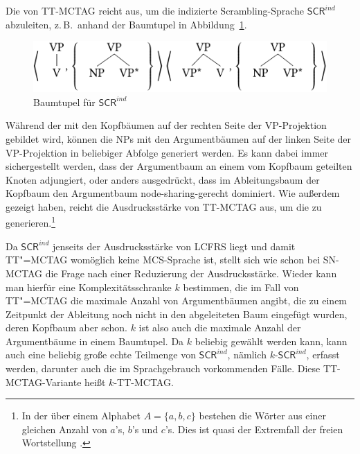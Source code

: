 Die  von TT-MCTAG reicht aus, um die indizierte Scrambling-Sprache $\mathsf{SCR}^{ind}$ abzuleiten, z.\,B.\ anhand der Baumtupel in Abbildung~\ref{fig-ttmctag-scr}.  
\begin{figure}[t]
\centering
\includegraphics{graphics/abb73.pdf}
\caption{Baumtupel für $\mathsf{SCR}^{ind}$\label{fig-ttmctag-scr}}
\end{figure}
Während der  mit den Kopfbäumen auf der rechten Seite der VP-Projektion gebildet wird, können die NPs mit den Argumentbäumen auf der linken Seite der VP-Projektion in beliebiger Abfolge generiert werden. Es kann dabei immer sichergestellt werden, dass der Argumentbaum an einem vom Kopfbaum geteilten Knoten adjungiert, oder anders ausgedrückt, dass im Ableitungsbaum der Kopfbaum den Argumentbaum node-sharing-gerecht dominiert. Wie  \citet{Sogaard:Lichte:Maier:07} au\ss erdem gezeigt haben, reicht die Ausdrucksstärke von TT-MCTAG  aus, um die  zu generieren.\footnote{In der  über einem Alphabet $A=\{a,b,c\}$ bestehen die Wörter aus einer gleichen Anzahl von $a$'s, $b$'s und $c$'s. Dies ist quasi der Extremfall der freien Wortstellung \citep{Bach:88}.}

Da $\mathsf{SCR}^{ind}$ jenseits der Ausdrucksstärke von LCFRS liegt und damit TT"=MCTAG womöglich keine MCS-Sprache ist, stellt sich wie schon bei SN-MCTAG die Frage nach einer Reduzierung der Ausdrucksstärke. Wieder kann man hierfür eine Komplexitätsschranke $k$ bestimmen, die im Fall von TT"=MCTAG die maximale Anzahl von Argumentbäumen angibt, die zu einem Zeitpunkt der Ableitung noch nicht in den abgeleiteten Baum eingefügt wurden, deren Kopfbaum aber schon. $k$ ist also auch die maximale Anzahl der Argumentbäume in einem Baumtupel. Da $k$ beliebig gewählt werden kann, kann auch eine beliebig gro\ss e echte Teilmenge von $\mathsf{SCR}^{ind}$, nämlich $k$-$\mathsf{SCR}^{ind}$, erfasst werden, darunter auch die im Sprachgebrauch vorkommenden Fälle. Diese TT-MCTAG-Variante hei\ss t $k$-TT-MCTAG.

